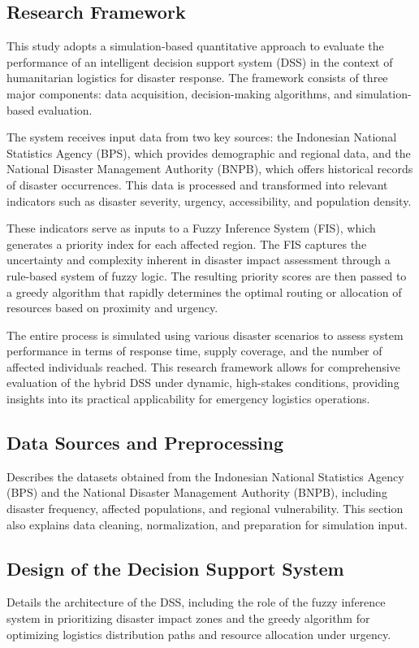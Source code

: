\documentclass[journal,final,a4paper,twoside,11pt]{IEEEtran}
\begin{document}
\subsection{Research Framework}

This study adopts a simulation-based quantitative approach to evaluate the performance of an intelligent decision support system (DSS) in the context of humanitarian logistics for disaster response. The framework consists of three major components: data acquisition, decision-making algorithms, and simulation-based evaluation.

The system receives input data from two key sources: the Indonesian National Statistics Agency (BPS), which provides demographic and regional data, and the National Disaster Management Authority (BNPB), which offers historical records of disaster occurrences. This data is processed and transformed into relevant indicators such as disaster severity, urgency, accessibility, and population density.

These indicators serve as inputs to a Fuzzy Inference System (FIS), which generates a priority index for each affected region. The FIS captures the uncertainty and complexity inherent in disaster impact assessment through a rule-based system of fuzzy logic. The resulting priority scores are then passed to a greedy algorithm that rapidly determines the optimal routing or allocation of resources based on proximity and urgency.

The entire process is simulated using various disaster scenarios to assess system performance in terms of response time, supply coverage, and the number of affected individuals reached. This research framework allows for comprehensive evaluation of the hybrid DSS under dynamic, high-stakes conditions, providing insights into its practical applicability for emergency logistics operations.


\subsection{Data Sources and Preprocessing}
Describes the datasets obtained from the Indonesian National Statistics Agency (BPS) and the National Disaster Management Authority (BNPB), including disaster frequency, affected populations, and regional vulnerability. This section also explains data cleaning, normalization, and preparation for simulation input.

\subsection{Design of the Decision Support System}
Details the architecture of the DSS, including the role of the fuzzy inference system in prioritizing disaster impact zones and the greedy algorithm for optimizing logistics distribution paths and resource allocation under urgency.
\end{document}
